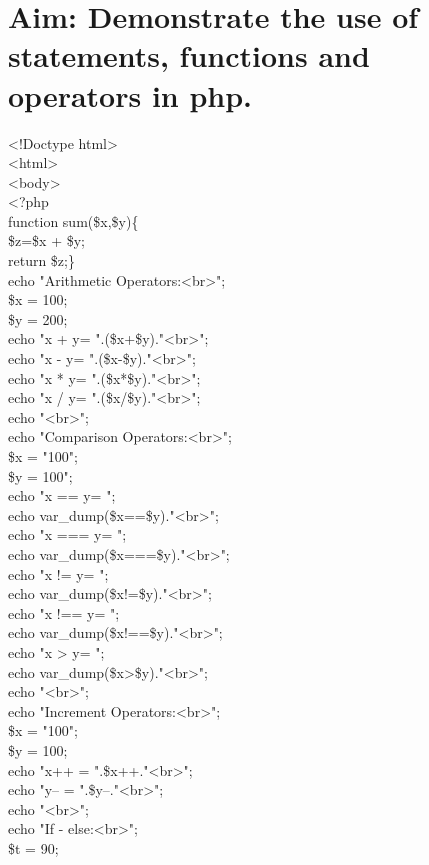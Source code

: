 \section*{\fontsize{16}{14}\selectfont Aim: Demonstrate the use of statements, functions  and operators in php.}
<!Doctype html>\\
<html>\\			
<body>\\
<?php\\
function sum(\$x,\$y)\{\\
  \$z=\$x + \$y;\\
  return \$z;\}\\
echo "Arithmetic Operators:<br>";\\
\$x = 100;\\
\$y = 200;\\
echo "x + y= ".(\$x+\$y)."<br>";\\
echo "x - y= ".(\$x-\$y)."<br>";\\
echo "x * y= ".(\$x*\$y)."<br>";\\
echo "x / y= ".(\$x/\$y)."<br>";\\
echo "<br>";\\
echo "Comparison Operators:<br>";\\
\$x = "100";\\
\$y = 100";\\
echo "x == y= ";\\
echo var\_dump(\$x==\$y)."<br>";\\
echo "x === y= ";\\
echo var\_dump(\$x===\$y)."<br>";\\
echo "x != y= ";\\
echo var\_dump(\$x!=\$y)."<br>";\\
echo "x !== y= ";\\
echo var\_dump(\$x!==\$y)."<br>";\\
echo "x > y= ";\\
echo var\_dump(\$x>\$y)."<br>";\\
echo "<br>";\\
echo "Increment Operators:<br>";\\
\$x = "100";\\
\$y = 100;\\
echo "x++ = ".\$x++."<br>";\\
echo "y-- = ".\$y--."<br>";\\
echo "<br>";\\
echo "If - else:<br>";\\
\$t = 90;\\
